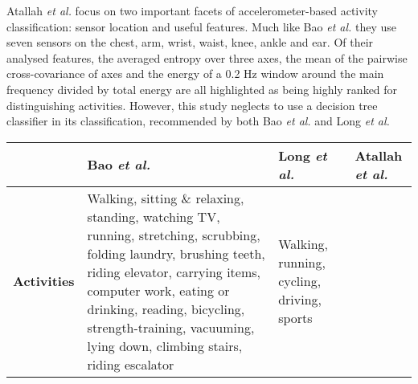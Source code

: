       Atallah \emph{et al.} \cite{atallah2010sensor} focus on two important facets of accelerometer-based activity classification: sensor location and useful features. Much like Bao \emph{et al.} they use seven sensors on the chest, arm, wrist, waist, knee, ankle and ear. Of their analysed features, the averaged entropy over three axes, the mean of the pairwise cross-covariance of axes and the energy of a 0.2 Hz window around the main frequency divided by total energy are all highlighted as being highly ranked for distinguishing activities. However, this study neglects to use a decision tree classifier in its classification, recommended by both Bao \emph{et al.} and Long \emph{et al.}
    \begin{table}[p]
      {\tabulinesep=1.2mm
      \begin{tabu} to 
        \hline
          & \textbf{Bao \emph{et al.} \cite{bao2004activity}}
          & \textbf{Long \emph{et al.} \cite{long2009single}}
          & \textbf{Atallah \emph{et al.} \cite{atallah2010sensor}} \\
        \hline
          \textbf{Activities}
          & Walking, \newline sitting \& relaxing, \newline standing, \newline watching TV,
              \newline running, \newline stretching, \newline scrubbing, \newline folding laundry, 
              \newline brushing teeth, \newline riding elevator, \newline carrying items, 
              \newline computer work, \newline eating or drinking, \newline reading, 
              \newline bicycling, \newline strength-training, \newline vacuuming, 
              \newline lying down, \newline climbing stairs, \newline riding escalator
          & Walking, \newline running, \newline cycling, \newline driving, \newline sports

\end{tabu}}
\end{table}
